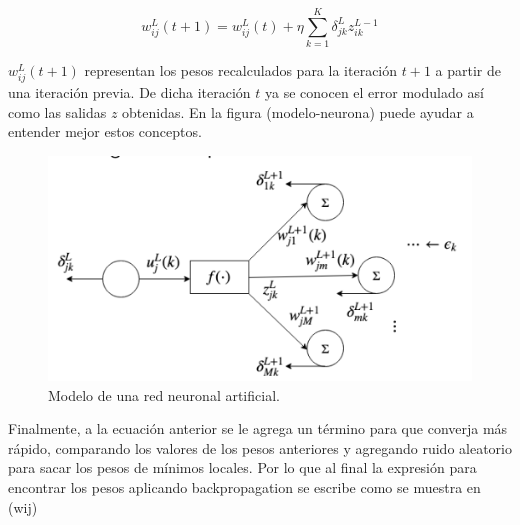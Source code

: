 \documentclass[twocolumn]{article}
\begin{document}
  \[
    w_{ij}^{L}(t+1) = w_{ij}^{L}(t) + \eta
    \sum_{k=1}^{K}\delta_{jk}^{L}z_{ik}^{L-1}
  \]

  $w_{ij}^{L}(t+1)$ representan los pesos recalculados para la iteración $t + 1$
  a partir de una iteración previa. De dicha iteración $t$ ya se conocen el
  error modulado así como las salidas $z$ obtenidas. En la figura
  (modelo-neurona) puede ayudar a entender mejor estos conceptos.

  \begin{figure}[ht!]
    \centering
    \includegraphics[width=0.9\linewidth]{backpropagation}
    \caption{Modelo de una red neuronal artificial.}
  \end{figure}

  Finalmente, a la ecuación anterior se le agrega un término para que converja
  más rápido, comparando los valores de los pesos anteriores y agregando ruido
  aleatorio para sacar los pesos de mínimos locales. Por lo que al final la
  expresión para encontrar los pesos aplicando backpropagation se escribe como
  se muestra en (wij) \cite{schoolar}

  \nocite{*}

  

\end{document}
